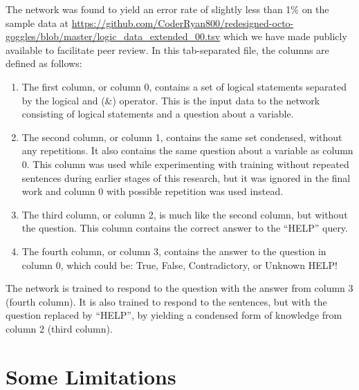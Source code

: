 \documentclass{article}
\begin{document}
The network was found to yield an error rate of slightly less than 1\% on the sample data at \url{https://github.com/CoderRyan800/redesigned-octo-goggles/blob/master/logic_data_extended_00.tsv} which we have made publicly available to facilitate peer review. In this tab-separated file, the columns are defined as follows:

\begin{enumerate}
	\item The first column, or column 0, contains a set of logical statements separated by the logical and (\&) operator. This is the input data to the network consisting of logical statements and a question about a variable.
	\item The second column, or column 1, contains the same set condensed, without any repetitions. It also contains the same question about a variable as column 0.  This column was used while experimenting with training without repeated sentences during earlier stages of this research, but it was ignored in the final work and column 0 with possible repetition 
		was used instead.
	\item The third column, or column 2, is much like the second column, but without the question.  This column contains
		the correct answer to the ``HELP'' query.
	\item The fourth column, or column 3, contains the answer to the question in column 0, which could be: True, False, Contradictory, or Unknown HELP!
\end{enumerate}

The network is trained to respond to the question with the answer from column 3 (fourth column). It is also trained to respond to the sentences, but with the question replaced by “HELP”, by yielding a condensed form of knowledge from column 2 (third column).

\section{Some Limitations}
\end{document}
